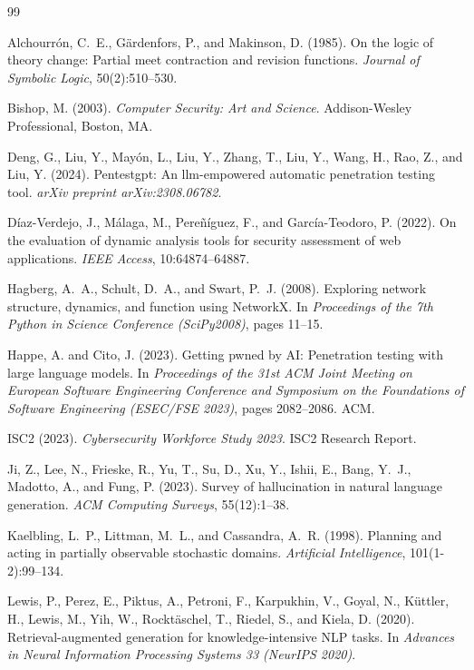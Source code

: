\documentclass[12pt,a4paper,oneside,openany]{book}
\begin{document}
\begin{thebibliography}{99}

Alchourr{\'o}n, C.~E., G{\"a}rdenfors, P., and Makinson, D. (1985).
On the logic of theory change: Partial meet contraction and revision functions.
\textit{Journal of Symbolic Logic}, 50(2):510--530.

Bishop, M. (2003).
\textit{Computer Security: Art and Science}.
Addison-Wesley Professional, Boston, MA.

Deng, G., Liu, Y., May\'on, L., Liu, Y., Zhang, T., Liu, Y., Wang, H., Rao, Z., and Liu, Y. (2024).
Pentestgpt: An llm-empowered automatic penetration testing tool.
\textit{arXiv preprint arXiv:2308.06782}.

D{\'i}az-Verdejo, J., M{\'a}laga, M., Pereñ{\'i}guez, F., and Garc{\'i}a-Teodoro, P. (2022).
On the evaluation of dynamic analysis tools for security assessment of web applications.
\textit{IEEE Access}, 10:64874--64887.

Hagberg, A.~A., Schult, D.~A., and Swart, P.~J. (2008).
Exploring network structure, dynamics, and function using NetworkX.
In \textit{Proceedings of the 7th Python in Science Conference (SciPy2008)}, pages 11--15.

Happe, A. and Cito, J. (2023).
Getting pwned by AI: Penetration testing with large language models.
In \textit{Proceedings of the 31st ACM Joint Meeting on European Software Engineering Conference and Symposium on the Foundations of Software Engineering (ESEC/FSE 2023)}, pages 2082--2086. ACM.

ISC2 (2023).
\textit{Cybersecurity Workforce Study 2023}.
ISC2 Research Report.

Ji, Z., Lee, N., Frieske, R., Yu, T., Su, D., Xu, Y., Ishii, E., Bang, Y.~J., Madotto, A., and Fung, P. (2023).
Survey of hallucination in natural language generation.
\textit{ACM Computing Surveys}, 55(12):1--38.

Kaelbling, L.~P., Littman, M.~L., and Cassandra, A.~R. (1998).
Planning and acting in partially observable stochastic domains.
\textit{Artificial Intelligence}, 101(1-2):99--134.

Lewis, P., Perez, E., Piktus, A., Petroni, F., Karpukhin, V., Goyal, N., K{\"u}ttler, H., Lewis, M., Yih, W., Rockt{\"a}schel, T., Riedel, S., and Kiela, D. (2020).
Retrieval-augmented generation for knowledge-intensive NLP tasks.
In \textit{Advances in Neural Information Processing Systems 33 (NeurIPS 2020)}.


\end{thebibliography}
\end{document}
